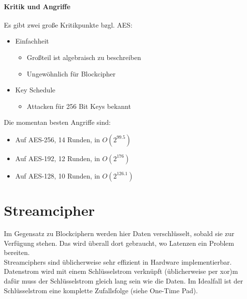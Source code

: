 \paragraph{Kritik und Angriffe}

Es gibt zwei große Kritikpunkte bzgl. AES: 

\begin{itemize}
    \item Einfachheit
    \begin{itemize}
        \item Großteil ist algebraisch zu beschreiben
        \item Ungewöhnlich für Blockcipher
    \end{itemize}
    \item Key Schedule 
    \begin{itemize}
        \item Attacken für 256 Bit Keys bekannt
    \end{itemize}
\end{itemize}

Die momentan besten Angriffe sind:

\begin{itemize}
    \item Auf AES-256, 14 Runden, in $O(2^{99.5})$
    \item Auf AES-192, 12 Runden, in $O(2^{176})$
    \item Auf AES-128, 10 Runden, in $O(2^{126.1})$
\end{itemize}


\section{Streamcipher}

Im Gegensatz zu Blockciphern werden hier Daten verschlüsselt, sobald sie zur
Verfügung stehen. Das wird überall dort gebraucht, wo Latenzen ein Problem bereiten.\\ 

\noindent Streamciphers sind üblicherweise sehr effizient in Hardware implementierbar. \\

\noindent Datenstrom wird mit einem Schlüsselstrom verknüpft (üblicherweise per xor)m dafür muss der Schlüsselstrom gleich lang 
sein wie die Daten.
Im Idealfall ist der Schlüsselstrom eine komplette Zufallsfolge (siehe One-Time Pad). \\

